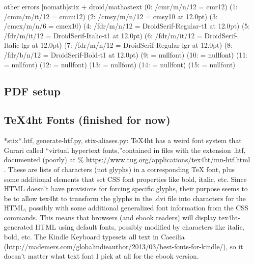 \documentclass[12pt]{article}
\begin{document}
other errors
[nomath]stix + droid/mathastext
(0: /cmr/m/n/12 = cmr12)
(1: \OML/cmm/m/it/12 = cmmi12)
(2: \OMS/cmsy/m/n/12 = cmsy10 at 12.0pt)
(3: \OMX/cmex/m/n/6 = cmex10)
(4: /fdr/m/n/12 = DroidSerif-Regular-t1 at 12.0pt)
(5: /fdr/m/it/12 = DroidSerif-Italic-t1 at 12.0pt)
(6: \LGR/fdr/m/it/12 = DroidSerif-Italic-lgr at 12.0pt)
(7: \LGR/fdr/m/n/12 = DroidSerif-Regular-lgr at 12.0pt)
(8: /fdr/b/n/12 = DroidSerif-Bold-t1 at 12.0pt)
(9: \nullfont = nullfont)
(10: \nullfont = nullfont)
(11: \nullfont = nullfont)
(12: \nullfont = nullfont)
(13: \nullfont = nullfont)
(14: \nullfont = nullfont)
(15: \nullfont = nullfont)


\subsection{PDF setup}
\label{sec:latex_pdf}





\subsection{TeX4ht Fonts (finished for now)}
\label{sec:tex4ht_fonts}

*stix*.htf, generate-htf.py, stix-aliases.py: TeX4ht has a weird font
system that Gurari called ``virtual hypertext fonts,''contained in
files with the extension .htf, documented (poorly) at
\url{%
https://www.tug.org/applications/tex4ht/mn-htf.html
} .  These are
lists of characters (not glyphs) in a corresponding TeX font, plus
some additional elements that set CSS font properties like bold,
italic, etc.  Since HTML doesn't have provisions for forcing specific
glyphs, their purpose seems to be to allow tex4ht to transform the
glyphs in the .dvi file into characters for the HTML, possibly with
some additional generalized font information from the CSS commands.
This means that browsers (and ebook readers) will display
tex4ht-generated HTML using default fonts, possibly modified by
characters like italic, bold, etc.  The Kindle Keyboard typesets all
text in Caecilia
(\url{http://mademers.com/globalindieauthor/2013/03/best-fonts-for-kindle/}),
so it doesn't matter what text font I pick at all for the ebook
version.
\end{document}
